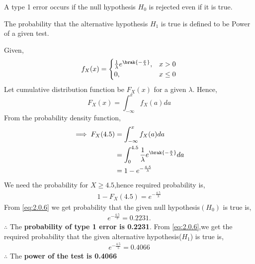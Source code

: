 %
\begin{definition}
\label{Type 1 error}A type 1 error occurs if the null hypothesis $H_{0}$ is rejected even if it is true.
\end{definition}
\begin{definition}
\label{Power of the test}The probability that the alternative hypothesis $H_{1}$ is true is defined to be Power of a given test. 
\end{definition}
Given,
\begin{equation}
f_{X}(x)=
\begin{cases}
\frac{1}{\lambda}e^{\brak{-\frac{x}{\lambda}}}, & x>0\\
0, & x\leq 0
\end{cases}
\end{equation}
Let cumulative distribution function be $F_{X}(x)$ for a given $\lambda$.
Hence,
\begin{equation}
    F_{X}(x)=\int_{-\infty}^{x}f_{X}(a) da
\end{equation}
From the probability density function,
\begin{align}
    \implies F_X(4.5)&=\int_{-\infty}^{x}f_{X}(a) da\\
    &=\int_{0}^{4.5}\frac{1}{\lambda}e^{\brak{-\frac{a}{\lambda}}}da\\
    &=1-e^{-\frac{4.5}{\lambda}}
\end{align}
We need the probability for $X\geq 4.5$,hence required probability is,
\begin{align}
1-F_{X}(4.5)=e^{-\frac{4.5}{\lambda}}\label{eq:2.0.6}
\end{align}
From \eqref{eq:2.0.6} we get probability that the given null hypothesis$(H_{0})$ is true is,
\begin{align}
e^{-\frac{4.5}{3}}=0.2231.
\end{align}
$\therefore$ The \textbf{probability of type 1 error is 0.2231}.
From \eqref{eq:2.0.6},we get the required probability that the given alternative hypothesis($H_{1}$) is true is,
\begin{align}
e^{-\frac{4.5}{5}}=0.4066
\end{align}
$\therefore$ The \textbf{power of the test is 0.4066}
